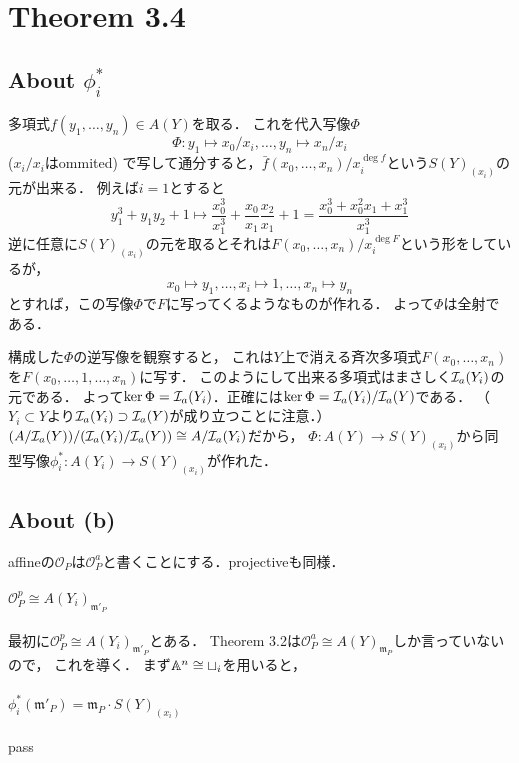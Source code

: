 \documentclass[a4paper]{jarticle}
\newcommand{\I}[1]{\mathfrak{#1}}
\begin{document}
\section{Theorem 3.4}
    \subsection{About $\phi^{\ast}_i$}
        多項式$f(y_1, \dots, y_n) \in A(Y)$を取る．
        これを代入写像$\Phi$
        \[ \Phi: y_1 \mapsto x_0/x_i, \dots, y_n \mapsto x_n/x_i \]($x_i/x_i$はommited)
        で写して通分すると，$\bar{f}(x_0,\dots,x_n)/x_i^{\deg f}$という$S(Y)_{(x_i)}$の元が出来る．
        例えば$i=1$とすると
        \[ y_1^3+y_1 y_2+1 \mapsto \frac{x_0^3}{x_1^3}+\frac{x_0}{x_1}\frac{x_2}{x_1}+1=\frac{x_0^3+x_0^2 x_1+x_1^3}{x_1^3} \]
        逆に任意に$S(Y)_{(x_i)}$の元を取るとそれは$F(x_0,\dots,x_n)/x_i^{\deg F}$という形をしているが，
        \[ x_0 \mapsto y_1, \dots, x_i \mapsto 1, \dots, x_n \mapsto y_n \]
        とすれば，この写像$\Phi$で$F$に写ってくるようなものが作れる．
        よって$\Phi$は全射である．

        構成した$\Phi$の逆写像を観察すると，
        これは$Y$上で消える斉次多項式$F(x_0,\dots,x_n)$を$F(x_0,\dots,1,\dots,x_n)$に写す．
        このようにして出来る多項式はまさしく$\mathcal{I}_a(Y_i)$の元である．
        よって$\ker \Phi=\mathcal{I}_a(Y_i)$．正確には$\ker \Phi=\mathcal{I}_a(Y_i)/\mathcal{I}_a(Y)$である．
        （$Y_i \subset Y$より$\mathcal{I}_a(Y_i) \supset \mathcal{I}_a(Y)$が成り立つことに注意．）
        $(A/\mathcal{I}_a(Y))/(\mathcal{I}_a(Y_i)/\mathcal{I}_a(Y)) \cong A/\mathcal{I}_a(Y_i)$だから，
        $\Phi: A(Y) \to S(Y)_{(x_i)}$から同型写像$\phi^{\ast}_i: A(Y_i) \to S(Y)_{(x_i)}$が作れた．

    \subsection{About (b)}
    affineの$\mathcal{O}_P$は$\mathcal{O}_P^a$と書くことにする．projectiveも同様．

    \paragraph{$\mathcal{O}_P^p \cong A(Y_i)_{\I{m}'_P}$}
    最初に$\mathcal{O}_P^p \cong A(Y_i)_{\I{m}'_P}$とある．
    Theorem 3.2は$\mathcal{O}_P^a \cong A(Y)_{\I{m}_P}$しか言っていないので，
    これを導く．
    まず$\mathbb{A}^n \cong \sqcup_i$を用いると，
    
    \paragraph{$\phi^{\ast}_i(\I{m}'_P)=\I{m}_P \cdot S(Y)_{(x_i)}$}
    pass
\end{document}
